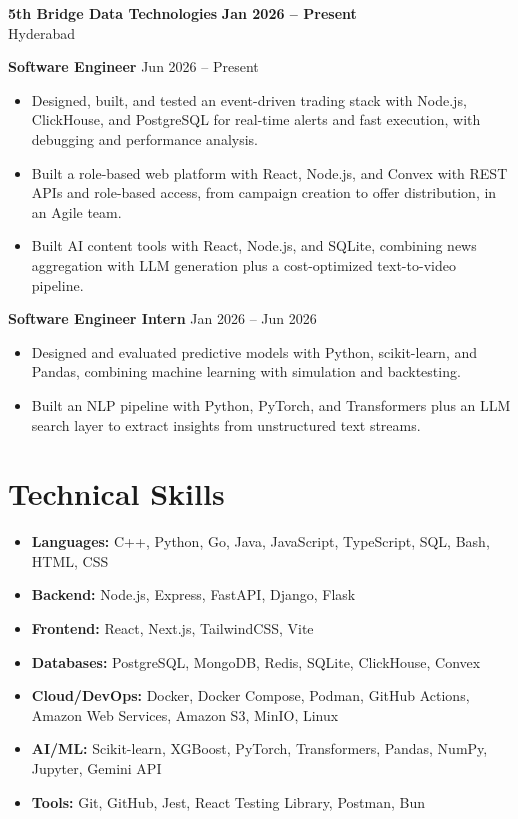 \documentclass[a4paper,11pt]{article}
\newcommand{\resumeItem}[1]{\item \small{#1}}
\newcommand{\resumeSubheading}[4]{%
  \textbf{#1} \hfill \textbf{#2} \\
{#3} \hfill {#4}
}
\newcommand{\resumeSubHeadingListStart}{\begin{itemize}}
\newcommand{\resumeSubHeadingListEnd}{\end{itemize}}
\begin{document}
\resumeSubheading
{5th Bridge Data Technologies}{Jan 2026 -- Present}
{Hyderabad}{}

\textbf{Software Engineer} \hfill {Jun 2026 -- Present}
\resumeSubHeadingListStart
\resumeItem{Designed, built, and tested an event-driven trading stack with Node.js, ClickHouse, and PostgreSQL for real-time alerts and fast execution, with debugging and performance analysis.}
\resumeItem{Built a role-based web platform with React, Node.js, and Convex with REST APIs and role-based access, from campaign creation to offer distribution, in an Agile team.}
\resumeItem{Built AI content tools with React, Node.js, and SQLite, combining news aggregation with LLM generation plus a cost-optimized text-to-video pipeline.}
\resumeSubHeadingListEnd

\textbf{Software Engineer Intern} \hfill {Jan 2026 -- Jun 2026}
\resumeSubHeadingListStart
\resumeItem{Designed and evaluated predictive models with Python, scikit-learn, and Pandas, combining machine learning with simulation and backtesting.}
\resumeItem{Built an NLP pipeline with Python, PyTorch, and Transformers plus an LLM search layer to extract insights from unstructured text streams.}
\resumeSubHeadingListEnd


\section*{Technical Skills}
\begin{itemize}
\item \textbf{Languages:} C++, Python, Go, Java, JavaScript, TypeScript, SQL, Bash, HTML, CSS
\item \textbf{Backend:} Node.js, Express, FastAPI, Django, Flask
\item \textbf{Frontend:} React, Next.js, TailwindCSS, Vite
\item \textbf{Databases:} PostgreSQL, MongoDB, Redis, SQLite, ClickHouse, Convex
\item \textbf{Cloud/DevOps:} Docker, Docker Compose, Podman, GitHub Actions, Amazon Web Services, Amazon S3, MinIO, Linux
\item \textbf{AI/ML:} Scikit-learn, XGBoost, PyTorch, Transformers, Pandas, NumPy, Jupyter, Gemini API
\item \textbf{Tools:} Git, GitHub, Jest, React Testing Library, Postman, Bun
\end{itemize}
\vspace{-0.2em}
\end{document}
